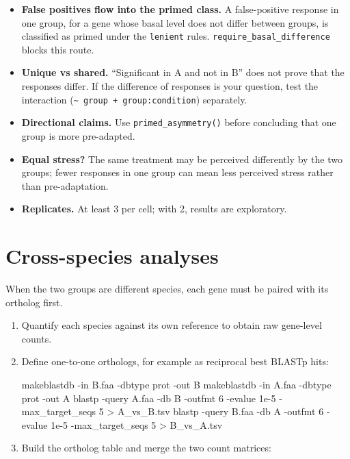 \documentclass[11pt,a4paper]{article}
\newcommand{\code}[1]{\texttt{\color{navy!85!black}#1}}
\begin{document}
\begin{itemize}
  \item \textbf{False positives flow into the primed class.} A false-positive response in one group, for a gene
        whose basal level does not differ between groups, is classified as primed under the
        \code{lenient} rules. \code{require\_basal\_difference} blocks this route.
  \item \textbf{Unique vs shared.} ``Significant in A and not in B'' does not prove that the responses
        differ. If the difference of responses is your question, test the interaction
        (\code{\textasciitilde{} group + group:condition}) separately.
  \item \textbf{Directional claims.} Use \code{primed\_asymmetry()} before concluding that one group is
        more pre-adapted.
  \item \textbf{Equal stress?} The same treatment may be perceived differently by the two groups; fewer
        responses in one group can mean less perceived stress rather than pre-adaptation.
  \item \textbf{Replicates.} At least 3 per cell; with 2, results are exploratory.
\end{itemize}

\section{Cross-species analyses}

When the two groups are different species, each gene must be paired with its ortholog first.

\begin{enumerate}
  \item Quantify each species against its own reference to obtain raw gene-level counts.
  \item Define one-to-one orthologs, for example as reciprocal best BLASTp hits:
\begin{shcode}
makeblastdb -in B.faa -dbtype prot -out B
makeblastdb -in A.faa -dbtype prot -out A
blastp -query A.faa -db B -outfmt 6 -evalue 1e-5 -max_target_seqs 5 > A_vs_B.tsv
blastp -query B.faa -db A -outfmt 6 -evalue 1e-5 -max_target_seqs 5 > B_vs_A.tsv
\end{shcode}
  \item Build the ortholog table and merge the two count matrices:
\end{enumerate}
\end{document}
